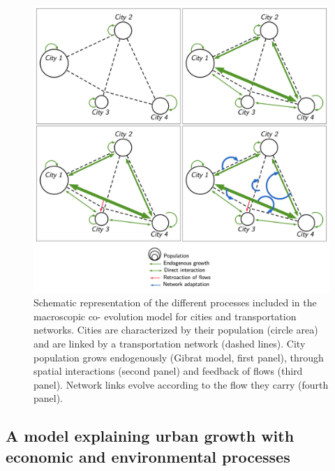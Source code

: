 \documentclass[10pt]{article}
\begin{document}
\begin{figure}
	\includegraphics[width=\linewidth]{Fig1.jpg}
	\caption{Schematic representation of the different processes included in the macroscopic co- evolution model for cities and transportation networks. Cities are characterized by their population (circle area) and are linked by a transportation network (dashed lines). City population grows endogenously (Gibrat model, first panel), through spatial interactions (second panel) and feedback of flows (third panel). Network links evolve according to the flow they carry (fourth panel).\label{fig:fig1}}	
\end{figure}




\subsection{A model explaining urban growth with economic and environmental processes}
\end{document}
